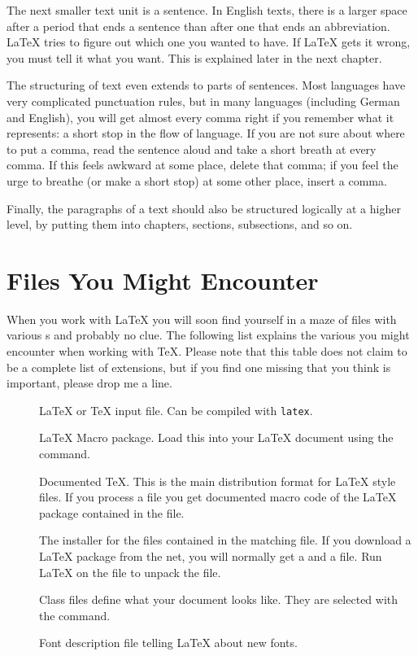 The next smaller text unit is a sentence.  In English texts, there is
a larger space after a period that ends a sentence than after one
that ends an abbreviation.  \LaTeX{} tries to figure out which one
you wanted to have.  If \LaTeX{} gets it wrong, you must tell it what
you want.  This is explained later in the next chapter.

The structuring of text even extends to parts of sentences.  Most
languages have very complicated punctuation rules, but in many
languages (including German and English), you will get almost every
comma right if you remember what it represents: a short stop in the
flow of language.  If you are not sure about where to put a comma,
read the sentence aloud and take a short breath at every comma.  If
this feels awkward at some place, delete that comma; if you feel the
urge to breathe (or make a short stop) at some other place, insert a
comma.

Finally, the paragraphs of a text should also be structured logically at a
higher level, by putting them into chapters, sections, subsections, and so on.

\section{Files You Might Encounter}

When you work with \LaTeX{} you will soon find yourself in a maze of
files with various s and probably no clue. The following
list explains the various  you might encounter when
working with \TeX{}. Please note that this table does not claim to be
a complete list of extensions, but if you find one missing that you
think is important, please drop me a line.

\begin{description}

  \item[] \LaTeX{} or \TeX{} input file. Can be compiled with
    \texttt{latex}.
  \item[] \LaTeX{} Macro package. Load this
    into your \LaTeX{} document using the  command.
  \item[] Documented \TeX{}. This is the main distribution
    format for \LaTeX{} style files. If you process a  file you get
    documented macro code of the \LaTeX{} package contained in the 
    file.
  \item[] The installer for the files contained in the
    matching  file. If you download a \LaTeX{} package from the net,
    you will normally get a  and a  file. Run \LaTeX{} on the
     file to unpack the  file.
  \item[] Class files define what your document looks
    like. They are selected with the  command.
  \item[] Font description file telling  \LaTeX{} about new fonts.
\end{description}

